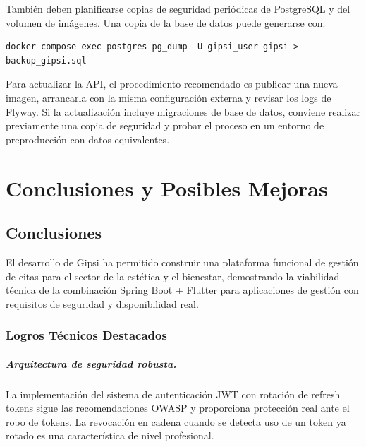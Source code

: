 \documentclass[12pt,a4paper,twoside]{report}
\begin{document}
También deben planificarse copias de seguridad periódicas de PostgreSQL y del
volumen de imágenes. Una copia de la base de datos puede generarse con:

\begin{lstlisting}[style=yamlStyle, caption={Copia de seguridad básica de PostgreSQL}, label={lst:backup-postgres}]
docker compose exec postgres pg_dump -U gipsi_user gipsi > backup_gipsi.sql
\end{lstlisting}

Para actualizar la API, el procedimiento recomendado es publicar una nueva
imagen, arrancarla con la misma configuración externa y revisar los logs de
Flyway. Si la actualización incluye migraciones de base de datos, conviene
realizar previamente una copia de seguridad y probar el proceso en un entorno
de preproducción con datos equivalentes.

\chapter{Conclusiones y Posibles Mejoras}

\section{Conclusiones}

El desarrollo de Gipsi ha permitido construir una plataforma funcional de gestión de citas para el sector de la estética y el bienestar, demostrando la viabilidad técnica de la combinación Spring Boot + Flutter para aplicaciones de gestión con requisitos de seguridad y disponibilidad real.

\subsection{Logros Técnicos Destacados}

\paragraph{Arquitectura de seguridad robusta.} La implementación del sistema de autenticación JWT con rotación de refresh tokens sigue las recomendaciones OWASP y proporciona protección real ante el robo de tokens. La revocación en cadena cuando se detecta uso de un token ya rotado es una característica de nivel profesional.
\end{document}
